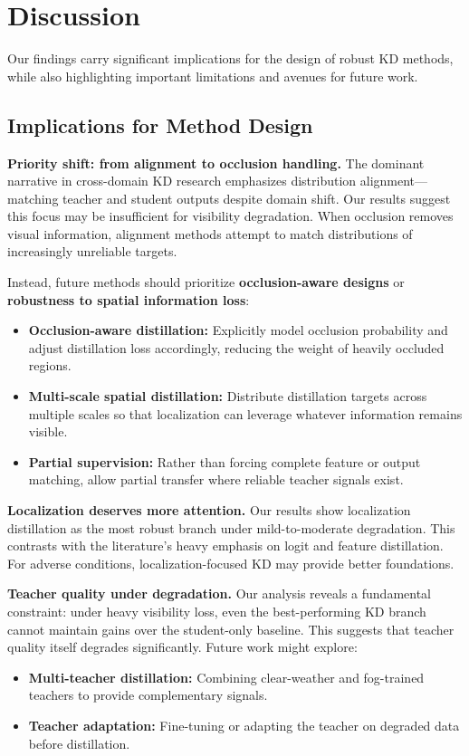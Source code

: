\section{Discussion}
\label{sec:discussion}

Our findings carry significant implications for the design of robust KD methods, while also highlighting important limitations and avenues for future work.

\subsection{Implications for Method Design}

\textbf{Priority shift: from alignment to occlusion handling.} The dominant narrative in cross-domain KD research emphasizes distribution alignment---matching teacher and student outputs despite domain shift. Our results suggest this focus may be insufficient for visibility degradation. When occlusion removes visual information, alignment methods attempt to match distributions of increasingly unreliable targets.

Instead, future methods should prioritize \textbf{occlusion-aware designs} or \textbf{robustness to spatial information loss}:
\begin{itemize}
    \item \textbf{Occlusion-aware distillation:} Explicitly model occlusion probability and adjust distillation loss accordingly, reducing the weight of heavily occluded regions.
    \item \textbf{Multi-scale spatial distillation:} Distribute distillation targets across multiple scales so that localization can leverage whatever information remains visible.
    \item \textbf{Partial supervision:} Rather than forcing complete feature or output matching, allow partial transfer where reliable teacher signals exist.
\end{itemize}

\textbf{Localization deserves more attention.} Our results show localization distillation as the most robust branch under mild-to-moderate degradation. This contrasts with the literature's heavy emphasis on logit and feature distillation. For adverse conditions, localization-focused KD may provide better foundations.

\textbf{Teacher quality under degradation.} Our analysis reveals a fundamental constraint: under heavy visibility loss, even the best-performing KD branch cannot maintain gains over the student-only baseline. This suggests that teacher quality itself degrades significantly. Future work might explore:
\begin{itemize}
    \item \textbf{Multi-teacher distillation:} Combining clear-weather and fog-trained teachers to provide complementary signals.
    \item \textbf{Teacher adaptation:} Fine-tuning or adapting the teacher on degraded data before distillation.
\end{itemize}

